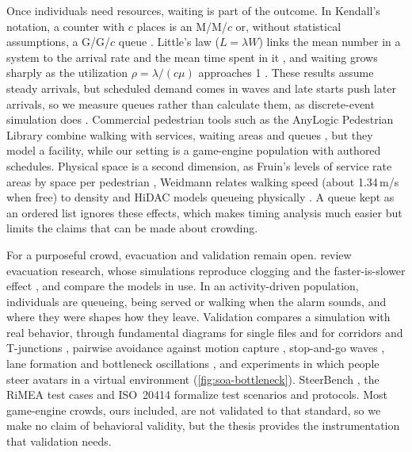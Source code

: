 Once individuals need resources, waiting is part of the outcome. In Kendall's notation, a counter with $c$ places is an M/M/$c$ or, without statistical assumptions, a G/G/$c$ queue \citep{kendall1953stochastic}. Little's law ($L = \lambda W$) links the mean number in a system to the arrival rate and the mean time spent in it \citep{little1961proof}, and waiting grows sharply as the utilization $\rho = \lambda/(c\mu)$ approaches 1 \citep{shortle2018fundamentals}. These results assume steady arrivals, but scheduled demand comes in waves and late starts push later arrivals, so we measure queues rather than calculate them, as discrete-event simulation does \citep{law2015simulation}. Commercial pedestrian tools such as the AnyLogic Pedestrian Library combine walking with services, waiting areas and queues \citep{anylogic2026pedestrian}, but they model a facility, while our setting is a game-engine population with authored schedules. Physical space is a second dimension, as Fruin's levels of service rate areas by space per pedestrian \citep{fruin1971pedestrian}, Weidmann relates walking speed (about 1.34\,m/s when free) to density \citep{weidmann1993transporttechnik} and HiDAC models queueing physically \mbox{\citep{pelechano2007controlling}}. A queue kept as an ordered list ignores these effects, which makes timing analysis much easier but limits the claims that can be made about crowding.

For a purposeful crowd, evacuation and validation remain open. \citet{schadschneider2009evacuation} review evacuation research, whose simulations reproduce clogging and the faster-is-slower effect \citep{helbing2000simulating}, and \citet{kuligowski2010review} compare the models in use. In an activity-driven population, individuals are queueing, being served or walking when the alarm sounds, and where they were shapes how they leave. Validation compares a simulation with real behavior, through fundamental diagrams for single files \citep{seyfried2005fundamental} and for corridors and T-junctions \citep{zhang2011transitions}, pairwise avoidance against motion capture \citep{pettre2009experiment}, stop-and-go waves \citep{lemercier2012realistic}, lane formation and bottleneck oscillations \citep{helbing2005self}, and experiments in which people steer avatars in a virtual environment \citep{moussaid2016crowd} (\cref{fig:soa-bottleneck}). SteerBench \citep{singh2009steerbench}, the RiMEA test cases \citep{rimea2025guideline} and ISO~20414 \citep{iso2020evacuation} formalize test scenarios and protocols. Most game-engine crowds, ours included, are not validated to that standard, so we make no claim of behavioral validity, but the thesis provides the instrumentation that validation needs.

